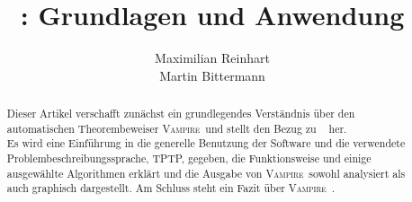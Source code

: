 \documentclass{article}
\author{
	Maximilian Reinhart\\
	Martin Bittermann
}
\title{\vampire: Grundlagen und Anwendung}
\newcommand{\vampire}{\textsc{Vampire}~}
\begin{document}
\maketitle

\begin{abstract}
	Dieser Artikel verschafft zunächst ein grundlegendes Verständnis über den automatischen Theorembeweiser \vampire und
	stellt den Bezug zu ~\cite{cav2013} her. \\
	Es wird eine Einführung in die generelle Benutzung der Software und die verwendete Problembeschreibungssprache, TPTP, gegeben, 
	die Funktionsweise und einige ausgewählte Algorithmen erklärt und
	die Ausgabe von \vampire sowohl analysiert als auch graphisch dargestellt.
	Am Schluss steht ein Fazit über \vampire.
\end{abstract}


\end{document}
